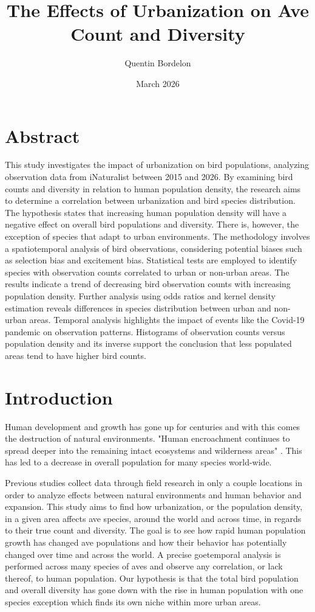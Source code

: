 \documentclass{article}
\title{The Effects of Urbanization on Ave Count and Diversity}
\author{Quentin Bordelon}
\date{March 2026}
\begin{document}
\maketitle

\tableofcontents

\section{Abstract}

This study investigates the impact of urbanization on bird populations, analyzing observation data from iNaturalist between 2015 and 2026. By examining bird counts and diversity in relation to human population density, the research aims to determine a correlation between urbanization and bird species distribution. The hypothesis states that increasing human population density will have a negative effect on overall bird populations and diversity. There is, however, the exception of species that adapt to urban environments. The methodology involves a spatiotemporal analysis of bird observations, considering potential biases such as selection bias and excitement bias. Statistical tests are employed to identify species with observation counts correlated to urban or non-urban areas. The results indicate a trend of decreasing bird observation counts with increasing population density. Further analysis using odds ratios and kernel density estimation reveals differences in species distribution between urban and non-urban areas. Temporal analysis highlights the impact of events like the Covid-19 pandemic on observation patterns. Histograms of observation counts versus population density and its inverse support the conclusion that less populated areas tend to have higher bird counts. 

\section{Introduction}

Human development and growth has gone up for centuries and with this comes the destruction of natural environments. "Human encroachment continues to spread deeper into the remaining intact ecosystems and wilderness areas" \cite{QuailStudy}. This has led to a decrease in overall population for many species world-wide.

Previous studies collect data through field research in only a couple locations in order to analyze effects between natural environments and human behavior and expansion. This study aims to find how urbanization, or the population density, in a given area affects ave species, around the world and across time, in regards to their true count and diversity. The goal is to see how rapid human population growth has changed ave populations and how their behavior has potentially changed over time and across the world. A precise goetemporal analysis is performed across many species of aves and observe any correlation, or lack thereof, to human population. Our hypothesis is that the total bird population and overall diversity has gone down with the rise in human population with one species exception which finds its own niche within more urban areas.
\end{document}
